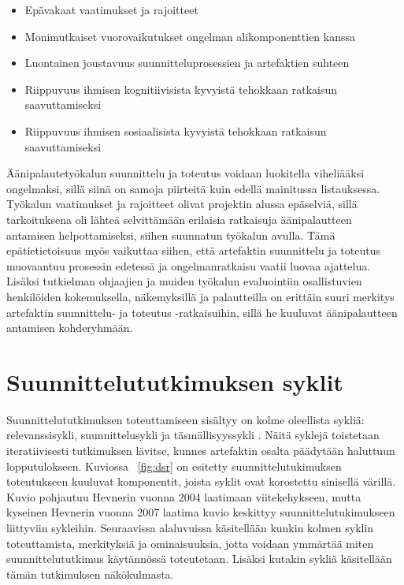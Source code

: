 \documentclass[utf8]{gradu3}
\begin{document}
\begin{itemize}
  \item Epävakaat vaatimukset ja rajoitteet
  \item Monimutkaiset vuorovaikutukset ongelman alikomponenttien kanssa
  \item Luontainen joustavuus suunnitteluprosessien ja artefaktien suhteen
  \item Riippuvuus ihmisen kognitiivisista kyvyistä tehokkaan ratkaisun saavuttamiseksi
  \item Riippuvuus ihmisen sosiaalisista kyvyistä tehokkaan ratkaisun saavuttamiseksi
\end{itemize}

Äänipalautetyökalun suunnittelu ja toteutus voidaan luokitella viheliääksi ongelmaksi, sillä siinä on samoja piirteitä kuin edellä mainitussa listauksessa. Työkalun vaatimukset ja rajoitteet olivat projektin alussa epäselviä, sillä tarkoituksena oli lähteä selvittämään erilaisia ratkaisuja äänipalautteen antamisen helpottamiseksi, siihen suunnatun työkalun avulla. Tämä epätietietoisuus myös vaikuttaa siihen, että artefaktin suunnittelu ja toteutus muovaantuu prosessin edetessä ja ongelmanratkaisu vaatii luovaa ajattelua. Lisäksi tutkielman ohjaajien ja muiden työkalun evaluointiin osallistuvien henkilöiden kokemuksella, näkemyksillä ja palautteilla on erittäin suuri merkitys artefaktin suunnittelu- ja toteutus -ratkaisuihin, sillä he kuuluvat äänipalautteen antamisen kohderyhmään.

%

\section{Suunnittelututkimuksen syklit}

Suunnittelututkimuksen toteuttamiseen sisältyy on kolme oleellista sykliä: relevanssisykli, suunnittelusykli ja täsmällisyyssykli \parencite[][]{cycles}. Näitä syklejä toistetaan iteratiivisesti tutkimuksen lävitse, kunnes artefaktin osalta päädytään haluttuun lopputulokseen. Kuviossa ~\ref{fig:dsr} on esitetty suunnittelutukimuksen toteutukseen kuuluvat komponentit, joista syklit ovat korostettu sinisellä värillä. Kuvio pohjautuu Hevnerin vuonna 2004 \parencite[][]{hevner2004} laatimaan viitekehykseen, mutta kyseinen Hevnerin vuonna 2007 \parencite[][]{cycles} laatima kuvio keskittyy suunnittelutukimukseen liittyviin sykleihin. Seuraavissa alaluvuissa käsitellään kunkin kolmen syklin toteuttamista, merkityksiä ja ominaisuuksia, jotta voidaan ymmärtää miten suunnittelututkimus käytännössä toteutetaan. Lisäksi kutakin sykliä käsitellään tämän tutkimuksen näkökulmasta.
\end{document}
